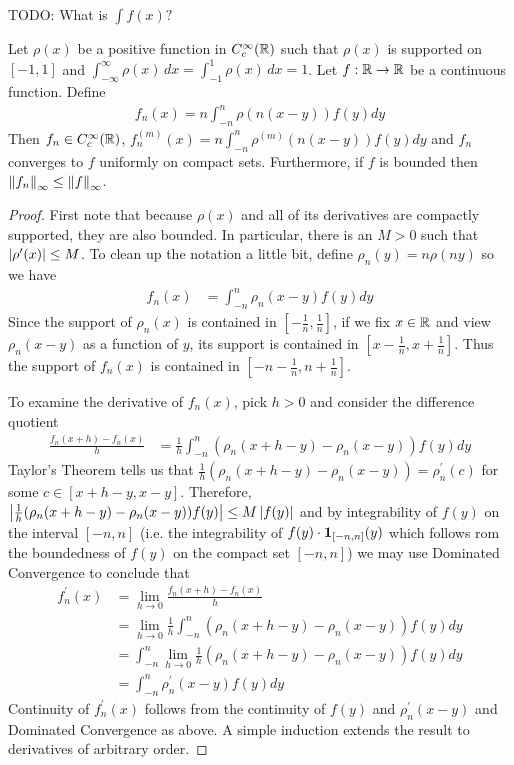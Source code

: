 TODO: What is $\int f(x)?$

\begin{lem}\label{ApproximationByMollifiers}Let $\rho(x)$ be a positive
  function in $C^\infty_c(\mathbb{R})$ such
  that $\rho(x)$ is supported on $[-1,1]$ and $\int_{-\infty}^\infty
  \rho(x) \, dx = \int_{-1}^1
  \rho(x) \, dx= 1$.  Let $f : \mathbb{R} \to \mathbb{R}$ be a continuous function.  Define 
\begin{align*}
f_n(x) = n \int_{-n}^n \rho(n(x - y)) f(y) dy
\end{align*}
Then $f_n \in C_c^\infty(\mathbb{R})$, $f_n^{(m)}(x) = n \int_{-n}^n
\rho^{(m)}(n(x -y)) f(y) dy$ and $f_n$ converges to $f$ uniformly on
compact sets.  Furthermore, if $f$ is bounded then $\left \lVert f_n \right \rVert_\infty \leq
\left \lVert f \right \rVert_\infty$.
\end{lem}
\begin{proof}
First note that because $\rho(x)$ and all of its derivatives are
compactly supported, they are also bounded.  In particular, there is
an $M > 0$ such that $\left \vert \rho^\prime(x) \right \vert \leq M$.  To clean up the notation
a little bit, define $\rho_n(y) = n\rho(ny)$ so we have
\begin{align*}
f_n(x) &= \int_{-n}^{n} \rho_n(x - y) f(y) dy
\end{align*}
Since the support of $\rho_n(x)$ is contained in
$[-\frac{1}{n},\frac{1}{n}]$, if we fix $x \in \mathbb{R}$ and
view $\rho_n(x - y)$ as a  function of $y$, its support is
contained in $[x-\frac{1}{n},x+\frac{1}{n}]$.  Thus the support of
$f_n(x)$ is contained in  $[-n-\frac{1}{n},n+\frac{1}{n}]$.

To examine the derivative
of $f_n(x)$, pick $h > 0$ and consider the difference
quotient
\begin{align*}
\frac{f_n(x + h) - f_n(x)}{h} &= \frac{1}{h} \int_{-n}^{n}
(\rho_n(x+h - y) - \rho_n(x - y) ) f(y) dy
\end{align*}
Taylor's Theorem tells us that $\frac{1}{h}(\rho_n(x+h - y) - \rho_n(x - y)) =
\rho_n^\prime(c)$ for some $c \in [x+h - y, x - y]$.  Therefore,
$\left \vert \frac{1}{h} (\rho_n(x+h - y) - \rho_n(x - y))f(y) \right \vert \leq M\left \vert f(y) \right \vert$ and by
integrability of $f(y)$ on the interval $[-n,n]$ (i.e. the
integrability of $f(y) \cdot \textbf{1}_{[-n,n]}(y)$ which follows
rom the boundedness of $f(y)$ on the compact set $[-n,n]$) we may use Dominated Convergence to conclude
that 
\begin{align*}
f_n^\prime(x) &=\lim_{h \to 0} \frac{f_n(x + h) - f_n(x)}{h} \\
&= \lim_{h \to 0} \frac{1}{h} \int_{-n}^{n}
(\rho_n(x+h - y) - \rho_n(x - y) ) f(y) dy \\
&= \int_{-n}^{n }
\lim_{h \to 0} \frac{1}{h} (\rho_n(x+h - y) - \rho_n(x - y) ) f(y) dy
\\
&= \int_{-n}^{n} \rho^\prime_n(x - y) f(y) dy 
\end{align*} 
Continuity of $f_n^\prime(x)$ follows from the continuity of $f(y)$
and $\rho^\prime_n(x - y) $ and Dominated Convergence as above.  A simple induction extends the result to derivatives of arbitrary
order.


\end{proof}
